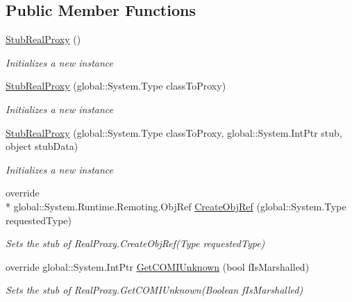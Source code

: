 \subsection*{Public Member Functions}
\begin{DoxyCompactItemize}
\item 
\hyperlink{class_system_1_1_runtime_1_1_remoting_1_1_proxies_1_1_fakes_1_1_stub_real_proxy_a0e37e7fef5f31ff3bae1b319168e185f}{Stub\-Real\-Proxy} ()
\begin{DoxyCompactList}\small\item\em Initializes a new instance\end{DoxyCompactList}\item 
\hyperlink{class_system_1_1_runtime_1_1_remoting_1_1_proxies_1_1_fakes_1_1_stub_real_proxy_a0a652844a03e283c4404ae82b6a6b676}{Stub\-Real\-Proxy} (global\-::\-System.\-Type class\-To\-Proxy)
\begin{DoxyCompactList}\small\item\em Initializes a new instance\end{DoxyCompactList}\item 
\hyperlink{class_system_1_1_runtime_1_1_remoting_1_1_proxies_1_1_fakes_1_1_stub_real_proxy_a9c425c2167a168c77a30e1fdb33b3c7e}{Stub\-Real\-Proxy} (global\-::\-System.\-Type class\-To\-Proxy, global\-::\-System.\-Int\-Ptr stub, object stub\-Data)
\begin{DoxyCompactList}\small\item\em Initializes a new instance\end{DoxyCompactList}\item 
override \\*
global\-::\-System.\-Runtime.\-Remoting.\-Obj\-Ref \hyperlink{class_system_1_1_runtime_1_1_remoting_1_1_proxies_1_1_fakes_1_1_stub_real_proxy_a90d1b4f326c294da3523150a5f247abe}{Create\-Obj\-Ref} (global\-::\-System.\-Type requested\-Type)
\begin{DoxyCompactList}\small\item\em Sets the stub of Real\-Proxy.\-Create\-Obj\-Ref(\-Type requested\-Type)\end{DoxyCompactList}\item 
override global\-::\-System.\-Int\-Ptr \hyperlink{class_system_1_1_runtime_1_1_remoting_1_1_proxies_1_1_fakes_1_1_stub_real_proxy_ab08c330c307b873647d5935fb89477e8}{Get\-C\-O\-M\-I\-Unknown} (bool f\-Is\-Marshalled)
\begin{DoxyCompactList}\small\item\em Sets the stub of Real\-Proxy.\-Get\-C\-O\-M\-I\-Unknown(\-Boolean f\-Is\-Marshalled)\end{DoxyCompactList}\item 

\end{DoxyCompactItemize}
